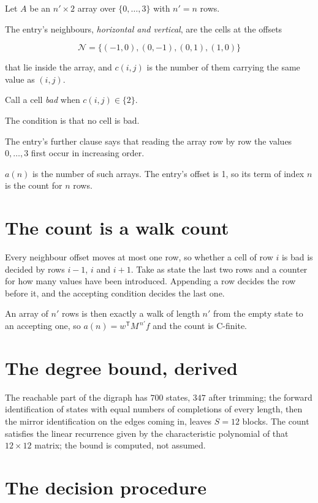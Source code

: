 \documentclass[11pt]{article}
\theoremstyle{definition}
\begin{document}
Let $A$ be an $n' \times 2$ array over $\{0,\dots,3\}$ with $n' = n$ rows.

The entry's neighbours, {\itshape horizontal and vertical}, are the cells at the offsets

\[\mathcal{N} = \{(-1,0), (0,-1), (0,1), (1,0)\}\]

that lie inside the array, and $c(i,j)$ is the number of them carrying the same value as $(i,j)$.

Call a cell {\itshape bad} when $c(i,j) \in \{2\}$.

The condition is that no cell is bad.

The entry's further clause says that reading the array row by row the values $0,\dots,3$ first occur in increasing order.

$a(n)$ is the number of such arrays. The entry's offset is 1, so its term of index $n$ is the count for $n$ rows.

\section{The count is a walk count}

Every neighbour offset moves at most one row, so whether a cell of row $i$ is bad is decided by rows $i-1$, $i$ and $i+1$. Take as state the last two rows and a counter for how many values have been introduced. Appending a row decides the row before it, and the accepting condition decides the last one.

An array of $n'$ rows is then exactly a walk of length $n'$ from the empty state to an accepting one, so $a(n) = w^{\mathsf T}M^{\,n'}f$ and the count is C-finite.

\section{The degree bound, derived}

The reachable part of the digraph has $700$ states, $347$ after trimming; the forward identification of states with equal numbers of completions of every length, then the mirror identification on the edges coming in, leaves $S = 12$ blocks. The count satisfies the linear recurrence given by the characteristic polynomial of that $12\times12$ matrix; the bound is computed, not assumed.

\section{The decision procedure}
\end{document}
